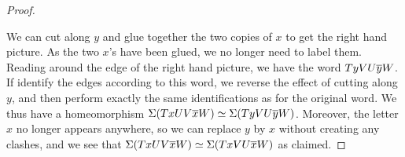 \documentclass[reqno]{amsart}
\theoremstyle{definition}
\begin{document}
\begin{proof}
\begin{center}
 \end{center}
 We can cut along $y$ and glue together the two copies of $x$ to get
 the right hand picture.  As the two $x$'s have been glued, we no
 longer need to label them.  Reading around the edge of the right hand
 picture, we have the word $TyVU\overline{y} W$.  If identify the edges
 according to this word, we reverse the effect of cutting along $y$,
 and then perform exactly the same identifications as for the original
 word.  We thus have a homeomorphism
 $\Sigma(TxUV\overline{x} W)\simeq\Sigma(TyVU\overline{y} W)$.  Moreover, the letter $x$ no
 longer appears anywhere, so we can replace $y$ by $x$ without
 creating any clashes, and we see that
 $\Sigma(TxUV\overline{x} W)\simeq\Sigma(TxVU\overline{x} W)$ as claimed.


\end{proof}
\end{document}
